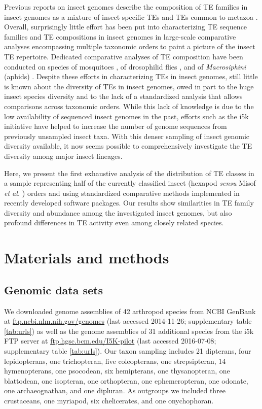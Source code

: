 Previous reports on insect genomes describe the composition of TE
families in insect genomes as a mixture of insect specific TEs and TEs
common to metazoa \citep{Feschotte2007,Maumus2015,Chuong2016}. Overall, surprisingly little
effort has been put into characterizing TE sequence families and TE
compositions in insect genomes in large-scale comparative analyses
encompassing multiple taxonomic orders to paint a picture of the insect
TE repertoire. Dedicated comparative analyses of TE composition have
been conducted on species of mosquitoes \citep{Neafsey2015}, of
drosophilid flies \citep{Sessegolo2016}, and of \emph{Macrosiphini}
(aphids) \citep{Bouallegue2017}. Despite these efforts in characterizing TEs
in insect genomes, still little is known about the diversity of TEs in
insect genomes, owed in part to the huge insect species diversity and to
the lack of a standardized analysis that allows comparisons across
taxonomic orders. While this lack of knowledge is due to the low
availability of sequenced insect genomes in the past, efforts such as
the i5k initiative \citep{Robinson2011} have helped to increase the number
of genome sequences from previously unsampled insect taxa. With this
denser sampling of insect genomic diversity available, it now seems
possible to comprehensively investigate the TE diversity among major
insect lineages.

Here, we present the first exhaustive analysis of the distribution of TE
classes in a sample representing half of the currently classified insect
(hexapod \emph{sensu} Misof \emph{et al.} \citep{Misof2014}) orders and
using standardized comparative methods implemented in recently developed
software packages. Our results show similarities in TE family diversity
and abundance among the investigated insect genomes, but also profound
differences in TE activity even among closely related species.


\section{Materials and methods}

\subsection{Genomic data sets}

We downloaded genome assemblies of 42 arthropod species from NCBI
GenBank at \url{ftp.ncbi.nlm.nih.gov/genomes} (last accessed 2014-11-26;
supplementary table \ref{tab:urls}) as well as the genome assemblies of 31
additional species from the i5k FTP server at
\href{ftp://ftp.hgsc.bcm.edu:/I5K-pilot/}{ftp.hgsc.bcm.edu/I5K-pilot}
(last accessed 2016-07-08; supplementary table \ref{tab:urls}). Our taxon sampling
includes 21 dipterans, four lepidopterans, one trichopteran, five
coleopterans, one strepsipteran, 14 hymenopterans, one psocodean, six
hemipterans, one thysanopteran, one blattodean, one isopteran, one
orthopteran, one ephemeropteran, one odonate, one archaeognathan, and
one dipluran. As outgroups we included three crustaceans, one myriapod,
six chelicerates, and one onychophoran.

